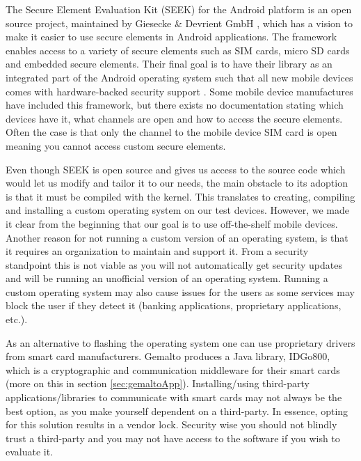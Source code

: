The Secure Element Evaluation Kit (SEEK) for the Android platform is an open source project, maintained by Giesecke \& Devrient GmbH \cite{Giesecke}, which has a vision to make it easier to use secure elements in Android applications. The framework enables access to a variety of secure elements such as SIM cards, micro SD cards and embedded secure elements. Their final goal is to have their library as an integrated part of the Android operating system such that all new mobile devices comes with hardware-backed security support \cite{SEEK}. Some mobile device manufactures have included this framework, but there exists no documentation stating which devices have it, what channels are open and how to access the secure elements. Often the case is that only the channel to the mobile device SIM card is open meaning you cannot access custom secure elements.

Even though SEEK is open source and gives us access to the source code which would let us modify and tailor it to our needs, the main obstacle to its adoption is that it must be compiled with the kernel. This translates to creating, compiling and installing a custom operating system on our test devices. However, we made it clear from the beginning that our goal is to use off-the-shelf mobile devices. Another reason for not running a custom version of an operating system, is that it requires an organization to maintain and support it. From a security standpoint this is not viable as you will not automatically get security updates and will be running an unofficial version of an operating system. Running a custom operating system may also cause issues for the users as some services may block the user if they detect it (banking applications, proprietary applications, etc.).

As an alternative to flashing the operating system one can use proprietary drivers from smart card manufacturers. Gemalto produces a Java library, IDGo800, which is a cryptographic and communication middleware for their smart cards (more on this in section \ref{sec:gemaltoApp}). Installing/using third-party applications/libraries to communicate with smart cards may not always be the best option, as you make yourself dependent on a third-party. In essence, opting for this solution results in a vendor lock. Security wise you should not blindly trust a third-party and you may not have access to the software if you wish to evaluate it.

